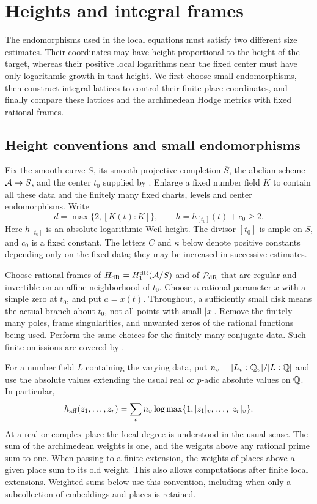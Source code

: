 \section{Heights and integral frames}
\label{ht:section}

The endomorphisms used in the local equations must satisfy two different
size estimates. Their coordinates may have height proportional to the
height of the target, whereas their positive local logarithms near the
fixed center must have only logarithmic growth in that height. We first
choose small endomorphisms, then construct integral lattices to control
their finite-place coordinates, and finally compare these lattices and
the archimedean Hodge metrics with fixed rational frames.

\subsection{Height conventions and small endomorphisms}

\begin{convention}\label{ht:conventions}
Fix the smooth curve $S$, its smooth projective completion $\overline S$,
the abelian scheme $\mathcal A\to S$, and the center $t_0$ supplied by
. Enlarge a fixed number field $K$ to contain
all these data and the finitely many fixed charts, levels and center
endomorphisms. Write
\[
 d=\max\{2,[K(t):K]\},\qquad
 h=h_{[t_0]}(t)+c_0\geq 2.
\]
Here $h_{[t_0]}$ is an absolute logarithmic Weil height. The divisor
$[t_0]$ is ample on $\overline S$, and $c_0$ is a fixed constant.
The letters $C$ and $\kappa$ below denote positive constants depending
only on the fixed data; they may be increased in successive estimates.

Choose rational frames of $H_{\rm dR}=H_1^{\rm dR}(\mathcal A/S)$ and of
$\mathcal P_{\rm dR}$ that are regular and invertible on an affine neighborhood
of $t_0$. Choose a rational parameter $x$ with a simple zero at $t_0$,
and put $a=x(t)$. Throughout, a sufficiently small disk means the
actual branch about $t_0$, not all points with small $|x|$.
Remove the finitely many poles, frame singularities, and unwanted zeros
of the rational functions being used. Perform the same choices for the
finitely many conjugate data. Such finite omissions are covered by
.

For a number field $L$ containing the varying data, put
$n_v=[L_v:\mathbb Q_v]/[L:\mathbb Q]$ and use the absolute values extending the
usual real or $p$-adic absolute values on $\mathbb Q$. In particular,
\[
 h_{\rm aff}(z_1,\ldots,z_r)
   =\sum_v n_v\log\max\{1,|z_1|_v,\ldots,|z_r|_v\}.
\]
At a real or complex place the local degree is understood in the usual
sense. The sum of the archimedean weights is one, and the weights above
any rational prime sum to one. When passing to a finite extension, the
weights of places above a given place sum to its old weight. This also
allows computations after finite local extensions. Weighted sums below
use this convention, including when only a subcollection of embeddings
and places is retained.
\end{convention}

